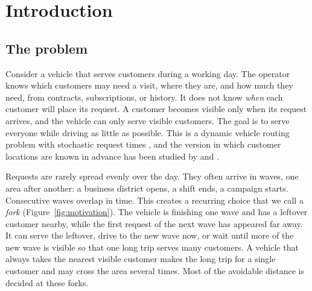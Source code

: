 \documentclass[5p,times,authoryear]{elsarticle}
\begin{document}

\section{Introduction}
\label{sec:intro}

\subsection{The problem}

Consider a vehicle that serves customers during a working day. The operator knows which customers may need a visit, where they are, and how much they need, from contracts, subscriptions, or history. It does not know \emph{when} each customer will place its request. A customer becomes visible only when its request arrives, and the vehicle can only serve visible customers. The goal is to serve everyone while driving as little as possible. This is a dynamic vehicle routing problem with stochastic request times \citep{psaraftis2016dynamic,pillac2013review,ritzinger2016survey}, and the version in which customer locations are known in advance has been studied by \citet{thomas2007waiting} and \citet{saintguillain2017ssvrptw}.

Requests are rarely spread evenly over the day. They often arrive in waves, one area after another: a business district opens, a shift ends, a campaign starts. Consecutive waves overlap in time. This creates a recurring choice that we call a \emph{fork} (Figure~\ref{fig:motivation}). The vehicle is finishing one wave and has a leftover customer nearby, while the first request of the next wave has appeared far away. It can serve the leftover, drive to the new wave now, or wait until more of the new wave is visible so that one long trip serves many customers. A vehicle that always takes the nearest visible customer makes the long trip for a single customer and may cross the area several times. Most of the avoidable distance is decided at these forks.
\end{document}
